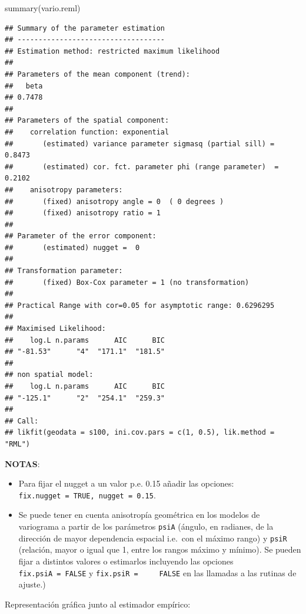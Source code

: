 \documentclass[
  spanish,
]{book}
\newenvironment{Shaded}{\begin{snugshade}}{\end{snugshade}}
\newcommand{\FunctionTok}[1]{\textcolor[rgb]{0.00,0.00,0.00}{#1}}
\newcommand{\NormalTok}[1]{#1}
\theoremstyle{break}
\theoremstyle{definition}
\theoremstyle{definition}
\theoremstyle{definition}
\theoremstyle{definition}
\theoremstyle{remark}
\begin{document}
\begin{Shaded}
\begin{Highlighting}[]
\FunctionTok{summary}\NormalTok{(vario.reml)}
\end{Highlighting}
\end{Shaded}

\begin{verbatim}
## Summary of the parameter estimation
## -----------------------------------
## Estimation method: restricted maximum likelihood 
## 
## Parameters of the mean component (trend):
##   beta 
## 0.7478 
## 
## Parameters of the spatial component:
##    correlation function: exponential
##       (estimated) variance parameter sigmasq (partial sill) =  0.8473
##       (estimated) cor. fct. parameter phi (range parameter)  =  0.2102
##    anisotropy parameters:
##       (fixed) anisotropy angle = 0  ( 0 degrees )
##       (fixed) anisotropy ratio = 1
## 
## Parameter of the error component:
##       (estimated) nugget =  0
## 
## Transformation parameter:
##       (fixed) Box-Cox parameter = 1 (no transformation)
## 
## Practical Range with cor=0.05 for asymptotic range: 0.6296295
## 
## Maximised Likelihood:
##    log.L n.params      AIC      BIC 
## "-81.53"      "4"  "171.1"  "181.5" 
## 
## non spatial model:
##    log.L n.params      AIC      BIC 
## "-125.1"      "2"  "254.1"  "259.3" 
## 
## Call:
## likfit(geodata = s100, ini.cov.pars = c(1, 0.5), lik.method = "RML")
\end{verbatim}

\textbf{NOTAS}:

\begin{itemize}
\item
  Para fijar el nugget a un valor p.e. 0.15 añadir las opciones:
  \texttt{fix.nugget\ =\ TRUE,\ nugget\ =\ 0.15}.
\item
  Se puede tener en cuenta anisotropía geométrica en los modelos de
  variograma a partir de los parámetros \texttt{psiA} (ángulo, en radianes,
  de la dirección de mayor dependencia espacial i.e.~con el
  máximo rango) y \texttt{psiR} (relación, mayor o igual que 1, entre los
  rangos máximo y mínimo). Se pueden fijar a distintos valores o
  estimarlos incluyendo las opciones \texttt{fix.psiA\ =\ FALSE} y \texttt{fix.psiR\ =\ \ \ \ \ FALSE} en las llamadas a las rutinas de ajuste.)
\end{itemize}

Representación gráfica junto al estimador empírico:
\end{document}
